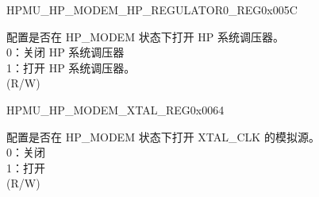 \begin{register}{H}{PMU\_HP\_MODEM\_HP\_REGULATOR0\_REG}{0x005C}\label{regdesc:PMUHPMODEMHPREGULATOR0REG}
%
%
%
%
\regnewline%
\begin{regdesc}\begin{reglist}
\label{fielddesc:PMUHPMODEMHPREGULATORXPD}\item [PMU\_HP\_MODEM\_HP\_REGULATOR\_XPD] 配置是否在 HP\_MODEM 状态下打开 HP 系统调压器。\\
0：关闭 HP 系统调压器 \\
1：打开 HP 系统调压器。\\
(R/W)

\end{reglist}\end{regdesc}
\end{register}


\begin{register}{H}{PMU\_HP\_MODEM\_XTAL\_REG}{0x0064}\label{regdesc:PMUHPMODEMXTALREG}
%
%
\regnewline%
\begin{regdesc}\begin{reglist}
\label{fielddesc:PMUHPMODEMXPDXTAL}\item [PMU\_HP\_MODEM\_XPD\_XTAL] 配置是否在 HP\_MODEM 状态下打开 XTAL\_CLK 的模拟源。\\
0：关闭\\
1：打开\\
(R/W)
\end{reglist}\end{regdesc}
\end{register}


